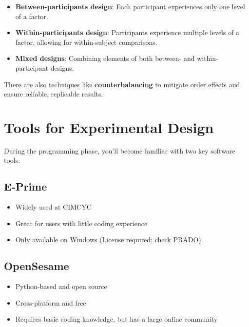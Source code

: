\documentclass[
  letterpaper,
  DIV=11,
  numbers=noendperiod]{scrreprt}
\providecommand{\tightlist}{%
  \setlength{\itemsep}{0pt}\setlength{\parskip}{0pt}}\usepackage{longtable,booktabs,array}
\begin{document}
\begin{itemize}
\tightlist
\item
  \textbf{Between-participants design}: Each participant experiences
  only one level of a factor.
\item
  \textbf{Within-participants design}: Participants experience multiple
  levels of a factor, allowing for within-subject comparisons.
\item
  \textbf{Mixed designs}: Combining elements of both between- and
  within-participant designs.
\end{itemize}

There are also techniques like \textbf{counterbalancing} to mitigate
order effects and ensure reliable, replicable results.

\hypertarget{tools-for-experimental-design}{%
\section{Tools for Experimental
Design}\label{tools-for-experimental-design}}

During the programming phase, you'll become familiar with two key
software tools:

\hypertarget{e-prime}{%
\subsection{E-Prime}\label{e-prime}}

\begin{itemize}
\tightlist
\item
  Widely used at CIMCYC
\item
  Great for users with little coding experience
\item
  Only available on Windows (License required; check PRADO)
\end{itemize}

\hypertarget{opensesame}{%
\subsection{OpenSesame}\label{opensesame}}

\begin{itemize}
\tightlist
\item
  Python-based and open source
\item
  Cross-platform and free
\item
  Requires basic coding knowledge, but has a large online community
\end{itemize}
\end{document}
